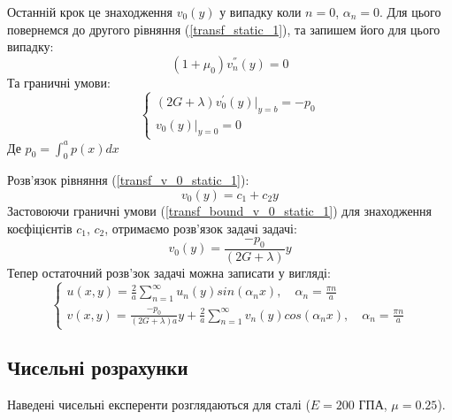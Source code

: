 Останній крок це знаходження $v_0(y)$ у випадку коли $n=0$, $\alpha_n =0$.
Для цього повернемся до другого рівняння (\ref{transf_static_1}), та запишем його для цього випадку:
\begin{equation}\label{transf_v_0_static_1}
    (1 + \mu_0) v_n^{''}(y) = 0
\end{equation}
Та граничні умови:
\begin{equation}\label{transf_bound_v_0_static_1}
    \begin{cases}
        (2G + \lambda)v_0^{'}(y)|_{y=b} = -p_0 \\
        v_0(y)|_{y=0} = 0
    \end{cases}
\end{equation}
Де $p_0 = \int_{0}^{a}p(x)dx$

Розв'язок рівняння (\ref{transf_v_0_static_1}):
\begin{equation}
    v_0(y) = c_1 + c_2 y
\end{equation}
Застовоючи граничні умови (\ref{transf_bound_v_0_static_1}) для знаходження коєфіцієнтів $c_1$, $c_2$, отримаємо розв'язок задачі задачі:
\begin{equation}
    v_0(y) = \frac{-p_0}{(2G + \lambda)}y
\end{equation}
Тепер остаточний розв'зок задачі можна записати у вигляді:
\begin{equation}
    \begin{cases}
        u(x,y) = \frac{2}{a} \sum_{n=1}^{\infty} u_n(y) sin(\alpha_n x), \quad \alpha_n = \frac{\pi n}{a} \\
        v(x,y) = \frac{-p_0}{(2G + \lambda)a}y + \frac{2}{a} \sum_{n=1}^{\infty} v_n(y) cos(\alpha_n x), \quad \alpha_n = \frac{\pi n}{a}
    \end{cases}
\end{equation}

\subsection{Чисельні розрахунки}
Наведені чисельні експеренти розглядаються для сталі ($E=200$ ГПА, $\mu=0.25$).


